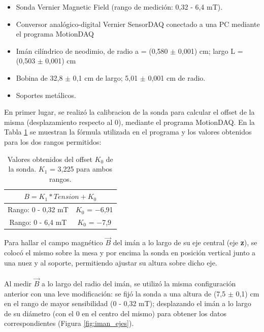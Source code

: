 \documentclass[12pt]{article}
\begin{document}
\begin{itemize}
    \item Sonda Vernier Magnetic Field (rango de medici\'on: 0,32 - 6,4 mT).
    
    \item Conversor analógico-digital Vernier SensorDAQ conectado a una PC mediante el programa MotionDAQ
    
    \item Im\'an cil\'indrico de neodimio, de radio a = (0,580 $\pm$ 0,001) cm; largo L = (0,503 $\pm$ 0,001) cm
    
    \item Bobina de 32,8 $\pm$ 0,1 cm de largo; 5,01 $\pm$ 0,001 cm de radio.
    
    \item Soportes met\'alicos.
\end{itemize}


En primer lugar, se realiz\'o la calibraci\´on de la sonda para calcular el offset de la misma (desplazamiento respecto al 0), mediante el programa MotionDAQ. En la Tabla \ref{tab:calib_sonda} se muestran la f\'ormula utilizada en el programa y los valores obtenidos para los dos rangos permitidos:

\begin{table}[h!]
\centering

\begin{tabular}{|c|c|}
\hline
\multicolumn{2}{|c|}{$B = K_{1}*Tension + K_{0}$} \\ \hline
Rango: 0 - 0,32 mT                       & $K_{0}$ = $-$6,91                  \\ \hline
Rango: 0 - 6,4 mT                  & $K_{0}$ = $-$7,9                  \\ \hline

\end{tabular}
\caption{Valores obtenidos del offset $K_{0}$ de la sonda. $K_{1}$ = 3,225 para ambos rangos.}
\label{tab:calib_sonda}
\end{table}

    
Para hallar el campo magn\'etico $\vec{B}$ del im\'an a lo largo de su eje central (eje \textbf{z}), se coloc\'o el mismo sobre la mesa y por encima la sonda en posici\'on vertical junto a una nuez y al soporte, permitiendo ajustar su altura sobre dicho eje.\\
\\
Al medir $\vec{B}$ a lo largo del radio del im\'an, se utiliz\'o la misma configuraci\'on anterior con una leve modificaci\'on: se fij\'o la sonda a una altura de (7,5 $\pm$ 0,1) cm en el rango de mayor sensibilidad (0 - 0,32 mT); desplazando el im\'an a lo largo de su di\'ametro (con el 0 en el centro del mismo) para obtener los datos correspondientes (Figura \ref{fig:iman_ejes}).
\end{document}
